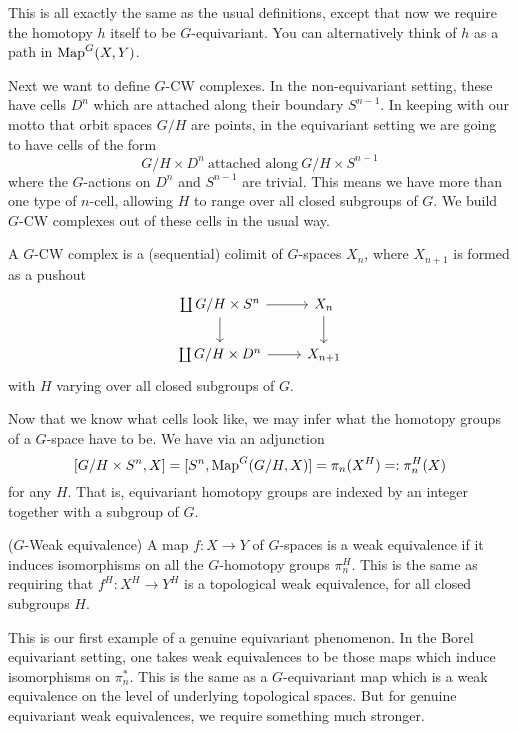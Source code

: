 \begin{remark}
    This is all exactly the same as the usual definitions, except that now we require the homotopy $h$ itself to be $G$-equivariant. You can alternatively think of $h$ as a path in $\operatorname{Map}^G(X, Y)$.
\end{remark}

Next we want to define $G$-CW complexes. In the non-equivariant setting, these have cells $D^n$ which are attached along their boundary $S^{n-1}$. In keeping with our motto that orbit spaces $G/H$ are points, in the equivariant setting we are going to have cells of the form
\[G/H \times D^n ~\text{attached along}~ G/H \times S^{n-1}\]
where the $G$-actions on $D^n$ and $S^{n-1}$ are trivial. This means we have more than one type of $n$-cell, allowing $H$ to range over all closed subgroups of $G$. We build $G$-CW complexes out of these cells in the usual way. 

\begin{defn}[$G$-CW complexes]
    A $G$-CW complex is a (sequential) colimit of $G$-spaces $X_n$, where $X_{n+1}$ is formed as a pushout
    \[\begin{tikzcd}
        \coprod G/H \times S^n \arrow[d] \arrow[r] & X_n \arrow[d] \\
        \coprod G/H \times D^n \arrow[r]           & X_{n+1}      
        \end{tikzcd}\]
    with $H$ varying over all closed subgroups of $G$.
\end{defn}

Now that we know what cells look like, we may infer what the homotopy groups of a $G$-space have to be. We have via an adjunction
\[[G/H \times S^n, X] = [S^n, \operatorname{Map}^G(G/H, X)] = \pi_n(X^H) =: \pi^H_n(X)\]
for any $H$. That is, equivariant homotopy groups are indexed by an integer together with a subgroup of $G$.

\begin{defn}($G$-Weak equivalence)
    A map $f: X \to Y$ of $G$-spaces is a weak equivalence if it induces isomorphisms on all the $G$-homotopy groups $\pi_n^H$. This is the same as requiring that $f^H: X^H \to Y^H$ is a topological weak equivalence, for all closed subgroups $H$.
\end{defn}

\begin{remark}
    This is our first example of a genuine equivariant phenomenon. In the Borel equivariant setting, one takes weak equivalences to be those maps which induce isomorphisms on $\pi_n^*$. This is the same as a $G$-equivariant map which is a weak equivalence on the level of underlying topological spaces. But for genuine equivariant weak equivalences, we require something much stronger.
\end{remark}

